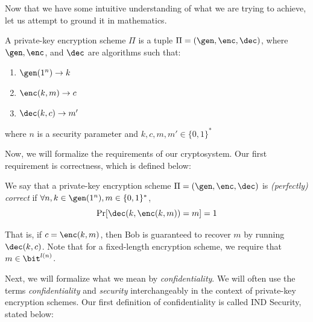 Now that we have some intuitive understanding of what we are trying to achieve, let us attempt to ground it in mathematics.

\begin{definition}
    A private-key encryption scheme $\Pi$ is a tuple $\Pi = (\gen, \enc, \dec)$, where $\gen, \enc$, and $\dec$ are algorithms such that:
    \begin{enumerate}
        \item $\gen(1^n) \rightarrow k$
        \item $\enc(k, m) \rightarrow c$
        \item $\dec(k, c) \rightarrow m'$
    \end{enumerate}
    
    where $n$ is a security parameter and $k, c, m, m' \in \{0, 1\}^*$
\end{definition}

Now, we will formalize the requirements of our cryptosystem.
Our first requirement is correctness, which is defined below:

\begin{definition}
    We say that a private-key encryption scheme $\Pi = (\gen, \enc, \dec)$ is \emph{(perfectly) correct} if 
    $\forall n, k \in \gen(1^n), m \in \{0,1\}^{*}$,
    $$\Pr[\dec(k,\enc(k,m)) = m] = 1$$
\end{definition}
That is, if $c = \enc(k, m)$, then Bob is guaranteed to recover $m$ by running $\dec(k, c)$. Note that for a fixed-length encryption scheme, we require that $m \in \bit^{l(n)}$.

Next, we will formalize what we mean by \textit{confidentiality}.
We will often use the terms \textit{confidentiality} and \textit{security} interchangeably in the context of private-key encryption schemes.
Our first definition of confidentiality is called IND Security, stated below:

